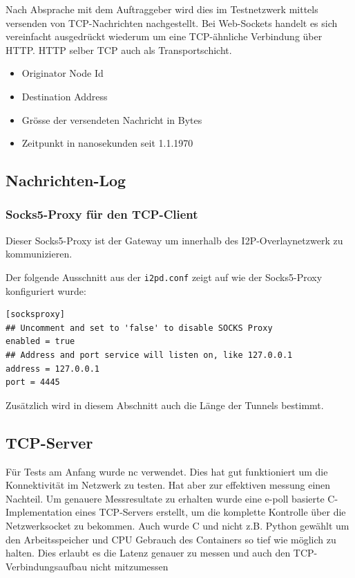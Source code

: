 Nach Absprache mit dem Auftraggeber wird dies im Testnetzwerk mittels versenden von TCP-Nachrichten nachgestellt.
Bei Web-Sockets handelt es sich vereinfacht ausgedrückt wiederum um eine TCP-ähnliche Verbindung über HTTP. HTTP selber TCP auch als Transportschicht.


\begin{itemize}
    \item Originator Node Id
    \item Destination Address
    \item Grösse der versendeten Nachricht in Bytes
    \item Zeitpunkt in nanosekunden seit 1.1.1970 
\end{itemize}

\subsection{Nachrichten-Log}


\subsubsection{Socks5-Proxy für den TCP-Client}

Dieser Socks5-Proxy ist der Gateway um innerhalb des I2P-Overlaynetzwerk zu kommunizieren.

Der folgende Ausschnitt aus der \lstinline|i2pd.conf| zeigt auf wie der Socks5-Proxy konfiguriert wurde:

\begin{lstlisting}
[socksproxy]
## Uncomment and set to 'false' to disable SOCKS Proxy
enabled = true
## Address and port service will listen on, like 127.0.0.1
address = 127.0.0.1
port = 4445
\end{lstlisting}

Zusätzlich wird in diesem Abschnitt auch die Länge der Tunnels bestimmt.

\subsection{TCP-Server}


Für Tests am Anfang wurde nc verwendet. Dies hat gut funktioniert um die Konnektivität im Netzwerk zu testen. Hat aber zur effektiven messung einen Nachteil.
Um genauere Messresultate zu erhalten wurde eine e-poll basierte C-Implementation eines TCP-Servers erstellt, um die komplette Kontrolle über die Netzwerksocket zu bekommen.
Auch wurde C und nicht z.B. Python gewählt um den Arbeitsspeicher und CPU Gebrauch des Containers so tief wie möglich zu halten.
Dies erlaubt es die Latenz genauer zu messen und auch den TCP-Verbindungsaufbau nicht mitzumessen

